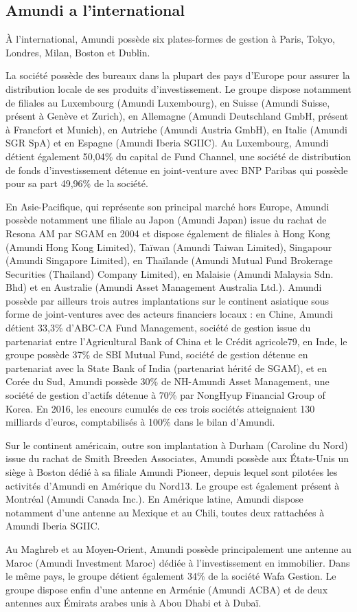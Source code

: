 \subsection{Amundi a l'international}
\par À l'international, Amundi possède six plates-formes de gestion à Paris, Tokyo, Londres, Milan, Boston et Dublin.
\par La société possède des bureaux dans la plupart des pays d'Europe pour assurer la distribution locale de ses produits d'investissement. Le groupe dispose notamment de filiales au Luxembourg (Amundi Luxembourg), en Suisse (Amundi Suisse, présent à Genève et Zurich), en Allemagne (Amundi Deutschland GmbH, présent à Francfort et Munich), en Autriche (Amundi Austria GmbH), en Italie (Amundi SGR SpA) et en Espagne (Amundi Iberia SGIIC). Au Luxembourg, Amundi détient également 50,04\% du capital de Fund Channel, une société de distribution de fonds d'investissement détenue en joint-venture avec BNP Paribas qui possède pour sa part 49,96\% de la société.
\par En Asie-Pacifique, qui représente son principal marché hors Europe, Amundi possède notamment une filiale au Japon (Amundi Japan) issue du rachat de Resona AM par SGAM en 2004 et dispose également de filiales à Hong Kong (Amundi Hong Kong Limited), Taïwan (Amundi Taiwan Limited), Singapour (Amundi Singapore Limited), en Thaïlande (Amundi Mutual Fund Brokerage Securities (Thailand) Company Limited), en Malaisie (Amundi Malaysia Sdn. Bhd) et en Australie (Amundi Asset Management Australia Ltd.). Amundi possède par ailleurs trois autres implantations sur le continent asiatique sous forme de joint-ventures avec des acteurs financiers locaux : en Chine, Amundi détient 33,3\% d'ABC-CA Fund Management, société de gestion issue du partenariat entre l'Agricultural Bank of China et le Crédit agricole79, en Inde, le groupe possède 37\% de SBI Mutual Fund, société de gestion détenue en partenariat avec la State Bank of India (partenariat hérité de SGAM), et en Corée du Sud, Amundi possède 30\% de NH-Amundi Asset Management, une société de gestion d'actifs détenue à 70\% par NongHyup Financial Group of Korea. En 2016, les encours cumulés de ces trois sociétés atteignaient 130 milliards d'euros, comptabilisés à 100\% dans le bilan d'Amundi.
\par Sur le continent américain, outre son implantation à Durham (Caroline du Nord) issue du rachat de Smith Breeden Associates, Amundi possède aux États-Unis un siège à Boston dédié à sa filiale Amundi Pioneer, depuis lequel sont pilotées les activités d'Amundi en Amérique du Nord13. Le groupe est également présent à Montréal (Amundi Canada Inc.). En Amérique latine, Amundi dispose notamment d'une antenne au Mexique et au Chili, toutes deux rattachées à Amundi Iberia SGIIC.
\par Au Maghreb et au Moyen-Orient, Amundi possède principalement une antenne au Maroc (Amundi Investment Maroc) dédiée à l'investissement en immobilier. Dans le même pays, le groupe détient également 34\% de la société Wafa Gestion. Le groupe dispose enfin d'une antenne en Arménie (Amundi ACBA) et de deux antennes aux Émirats arabes unis à Abou Dhabi et à Dubaï.
